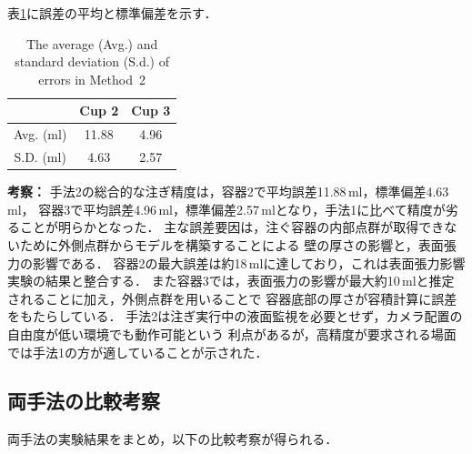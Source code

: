 表\ref{tab:pour_method2_error}に誤差の平均と標準偏差を示す．

\begin{table}[h]
	\caption{The average (Avg.) and standard deviation (S.d.) of errors in  Method~2}
	\label{tab:pour_method2_error}
	\centering
	\begin{tabular}{ccc}
		\toprule 
		& Cup 2 & Cup 3 \\ 
		\midrule
		Avg. (ml)		& 11.88  & 4.96  \\ 
		S.D. (ml)		& 4.63  & 2.57 \\ 
		\bottomrule
	\end{tabular}
\end{table}
\textbf{考察：}
手法2の総合的な注ぎ精度は，容器2で平均誤差11.88\,ml，標準偏差4.63\,ml，
容器3で平均誤差4.96\,ml，標準偏差2.57\,mlとなり，手法1に比べて精度が劣ることが明らかとなった．
主な誤差要因は，注ぐ容器の内部点群が取得できないために外側点群からモデルを構築することによる
壁の厚さの影響と，表面張力の影響である．
容器2の最大誤差は約18\,mlに達しており，これは表面張力影響実験の結果と整合する．
また容器3では，表面張力の影響が最大約10\,mlと推定されることに加え，外側点群を用いることで
容器底部の厚さが容積計算に誤差をもたらしている．
手法2は注ぎ実行中の液面監視を必要とせず，カメラ配置の自由度が低い環境でも動作可能という
利点があるが，高精度が要求される場面では手法1の方が適していることが示された．

\subsection{両手法の比較考察}
\label{sec:pour_exp_discussion}

両手法の実験結果をまとめ，以下の比較考察が得られる．

